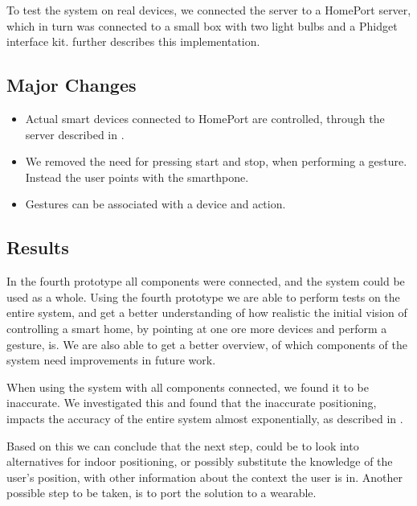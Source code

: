 To test the system on real devices, 
we connected the server to a HomePort server,
which in turn was connected to a small box with two light bulbs and a Phidget interface kit. 
 further describes this implementation. 

\subsection{Major Changes}

\begin{itemize}
\item Actual smart devices connected to HomePort are controlled, through the server described in .
\item We removed the need for pressing start and stop, when performing a gesture. Instead the user points with the smarthpone.
\item Gestures can be associated with a device and action.
\end{itemize}

\subsection{Results}

In the fourth prototype all components were connected, 
and the system could be used as a whole. 
Using the fourth prototype we are able to perform tests on the entire system, 
and get a better understanding of how realistic the initial vision of controlling a smart home, 
by pointing at one ore more devices and perform a gesture, is. 
We are also able to get a better overview, 
of which components of the system need improvements in future work.

When using the system with all components connected, 
we found it to be inaccurate. 
We investigated this and found that the inaccurate positioning, 
impacts the accuracy of the entire system almost exponentially, 
as described in .

Based on this we can conclude that the next step, 
could be to look into alternatives for indoor positioning, 
or possibly substitute the knowledge of the user's position, 
with other information about the context the user is in.
Another possible step to be taken, 
is to port the solution to a wearable.

